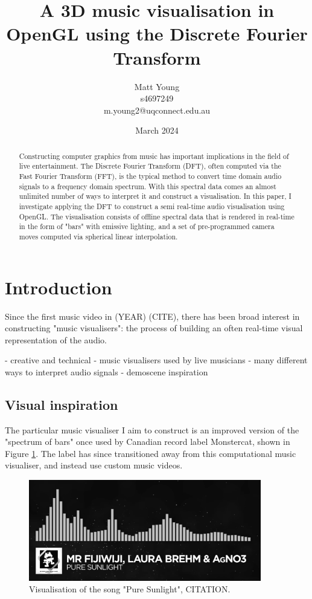\documentclass[11pt]{article}
\title{\textbf{A 3D music visualisation in OpenGL using the Discrete Fourier Transform}}
\author{Matt Young \\ s4697249 \\ m.young2@uqconnect.edu.au}
\date{March 2024}
\begin{document}
\maketitle

\begin{abstract}
    Constructing computer graphics from music has important implications in the field of live entertainment.
    The Discrete Fourier Transform (DFT), often computed via the Fast Fourier Transform (FFT), is the typical
    method to convert time domain audio signals to a frequency domain spectrum. With this spectral data comes
    an almost unlimited number of ways to interpret it and construct a visualisation. In this paper, I
    investigate applying the DFT to construct a semi real-time audio visualisation using OpenGL. The
    visualisation consists of offline spectral data that is rendered in real-time in the form of "bars" with
    emissive lighting, and a set of pre-programmed camera moves computed via spherical linear interpolation.
\end{abstract}

\tableofcontents

\section{Introduction}
Since the first music video in (YEAR) (CITE), there has been broad interest in constructing "music
visualisers": the process of building an often real-time visual representation of the audio.

- creative and technical
- music visualisers used by live musicians
- many different ways to interpret audio signals
- demoscene inspiration

\subsection{Visual inspiration}
The particular music visualiser I aim to construct is an improved version of the "spectrum of bars" once used
by Canadian record label Monstercat, shown in Figure \ref{monstercat}. The label has since transitioned away
from this computational music visualiser, and instead use custom music videos.

\begin{figure}[H]
\centering
\includegraphics[width=384px]{img/monstercat.png}
\caption{Visualisation of the song "Pure Sunlight", CITATION.}
\label{monstercat}
\end{figure}
\end{document}
